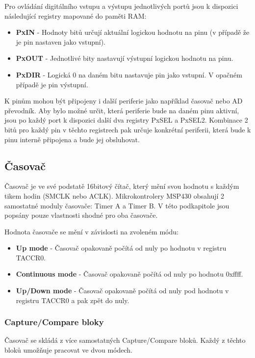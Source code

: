 Pro ovládání digitálního vstupu a výstupu jednotlivých portů jsou k dispozici následující registry mapované do paměti RAM:

\begin{itemize}
\item \textbf{PxIN} - Hodnoty bitů určují aktuální logickou hodnotu na pinu (v případě že je pin nastaven jako vstupní).
\item \textbf{PxOUT} - Jednotlivé bity nastavují výstupní logickou hodnotu na pinu.
\item \textbf{PxDIR} - Logická 0 na daném bitu nastavuje pin jako vstupní. V opačném případě je pin výstupní.
\end{itemize}

K pinům mohou být připojeny i další periferie jako například časovač nebo AD převodník. Aby bylo možné určit, která periferie bude na daném pinu aktivní, jsou po každý port k dispozici další dva registry PxSEL a PxSEL2. Kombinace 2 bitů pro každý pin v těchto registrech pak určuje konkrétní periferii, která
bude k pinu interně připojena a bude jej obsluhovat.

\subsection{Časovač}

Časovač je ve své podstatě 16bitový čítač, který mění svou hodnotu s každým tikem hodin (SMCLK nebo ACLK). Mikrokontrolery MSP430 obsahují 2 samostatné moduly časovače: Timer A a Timer B. V této podkapitole jsou popsány pouze vlastnosti shodné pro oba časovače.

Hodnota časovače se mění v závislosti na zvoleném módu:
\begin{itemize}
\item \textbf{Up mode} - Časovač opakovaně počítá od nuly po hodnotu v registru TACCR0.
\item \textbf{Continuous mode} - Časovač opakovaně počítá od nuly po hodnotu 0xffff.
\item \textbf{Up/Down mode} - Časovač opakovaně počítá od nuly pod hodnotu v registru TACCR0 a pak zpět do nuly.
\end{itemize}

\subsubsection{Capture/Compare bloky}

Časovač se skládá z více samostatných Capture/Compare bloků. Každý z těchto bloků umožňuje pracovat ve dvou módech.

